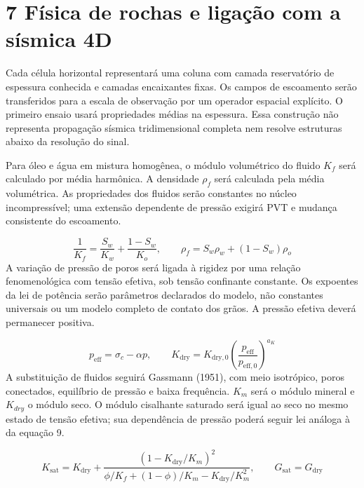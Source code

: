 \documentclass[12pt,a4paper]{article}
\begin{document}
\newpage
\section*{7 Física de rochas e ligação com a sísmica 4D}
Cada célula horizontal representará uma coluna com camada reservatório de espessura conhecida e camadas encaixantes fixas. Os campos de escoamento serão transferidos para a escala de observação por um operador espacial explícito. O primeiro ensaio usará propriedades médias na espessura. Essa construção não representa propagação sísmica tridimensional completa nem resolve estruturas abaixo da resolução do sinal.\par
Para óleo e água em mistura homogênea, o módulo volumétrico do fluido \(K_{f}\) será calculado por média harmônica. A densidade \(\rho_{f}\) será calculada pela média volumétrica. As propriedades dos fluidos serão constantes no núcleo incompressível; uma extensão dependente de pressão exigirá PVT e mudança consistente do escoamento.\par

\begin{equation}
\frac{1}{K_f}=\frac{S_w}{K_w}+\frac{1-S_w}{K_o},\qquad \rho_f=S_w\rho_w+(1-S_w)\rho_o
\end{equation}
A variação de pressão de poros será ligada à rigidez por uma relação fenomenológica com tensão efetiva, sob tensão confinante constante. Os expoentes da lei de potência serão parâmetros declarados do modelo, não constantes universais ou um modelo completo de contato dos grãos. A pressão efetiva deverá permanecer positiva.\par

\begin{equation}
p_{\mathrm{eff}}=\sigma_c-\alpha p,\qquad K_{\mathrm{dry}}=K_{\mathrm{dry},0}\left(\frac{p_{\mathrm{eff}}}{p_{\mathrm{eff},0}}\right)^{a_K}
\end{equation}
A substituição de fluidos seguirá Gassmann (1951), com meio isotrópico, poros conectados, equilíbrio de pressão e baixa frequência. \(K_{m}\) será o módulo mineral e \(K_{dry}\) o módulo seco. O módulo cisalhante saturado será igual ao seco no mesmo estado de tensão efetiva; sua dependência de pressão poderá seguir lei análoga à da equação 9.\par

\begin{equation}
K_{\mathrm{sat}}=K_{\mathrm{dry}}+\frac{(1-K_{\mathrm{dry}}/K_m)^2}{\phi/K_f+(1-\phi)/K_m-K_{\mathrm{dry}}/K_m^2},\qquad G_{\mathrm{sat}}=G_{\mathrm{dry}}
\end{equation}
\end{document}
